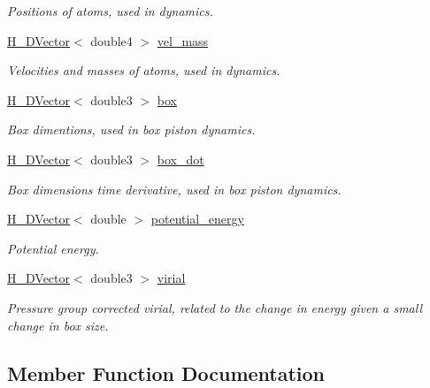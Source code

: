 \begin{DoxyCompactItemize}
\begin{DoxyCompactList}\small\item\em Positions of atoms, used in dynamics. \end{DoxyCompactList}\item 
\hyperlink{structH__DVector}{H\+\_\+\+D\+Vector}$<$ double4 $>$ \hyperlink{classCudaSimulationContext_a447bdf19525da955f30804b68a80efcf}{vel\+\_\+mass}
\begin{DoxyCompactList}\small\item\em Velocities and masses of atoms, used in dynamics. \end{DoxyCompactList}\item 
\hyperlink{structH__DVector}{H\+\_\+\+D\+Vector}$<$ double3 $>$ \hyperlink{classCudaSimulationContext_ab27a6d240361a27759e006728024e319}{box}
\begin{DoxyCompactList}\small\item\em Box dimentions, used in box piston dynamics. \end{DoxyCompactList}\item 
\hyperlink{structH__DVector}{H\+\_\+\+D\+Vector}$<$ double3 $>$ \hyperlink{classCudaSimulationContext_a2482b59305a454850b0d7d3e25f5830c}{box\+\_\+dot}
\begin{DoxyCompactList}\small\item\em Box dimensions time derivative, used in box piston dynamics. \end{DoxyCompactList}\item 
\hyperlink{structH__DVector}{H\+\_\+\+D\+Vector}$<$ double $>$ \hyperlink{classCudaSimulationContext_a353985244fa6f2dd2659120124f63bb5}{potential\+\_\+energy}
\begin{DoxyCompactList}\small\item\em Potential energy. \end{DoxyCompactList}\item 
\hyperlink{structH__DVector}{H\+\_\+\+D\+Vector}$<$ double3 $>$ \hyperlink{classCudaSimulationContext_a1f7666b2858c9720c33f04c67cd81302}{virial}
\begin{DoxyCompactList}\small\item\em Pressure group corrected virial, related to the change in energy given a small change in box size. \end{DoxyCompactList}\end{DoxyCompactItemize}


\subsection{Member Function Documentation}
\hypertarget{classCudaSimulationContext_ae52294d7e991824018cf9c9cb543ca1e}{}\label{classCudaSimulationContext_ae52294d7e991824018cf9c9cb543ca1e} 
